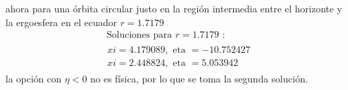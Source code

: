 ahora para una órbita circular justo en la región intermedia entre el horizonte y la ergoesfera en el ecuador $r= 1.7179$
\begin{equation}
\begin{array}{l}
\text { Soluciones para } r=1.7179 \text { : }\\
\begin{array}{l}
x i=4.179089, \text { eta }=-10.752427 \\
x i=2.448824, \text { eta }=5.053942
\end{array}
\end{array}
\end{equation}
la opción con $\eta < 0$ no es física, por lo que se toma la segunda solución.